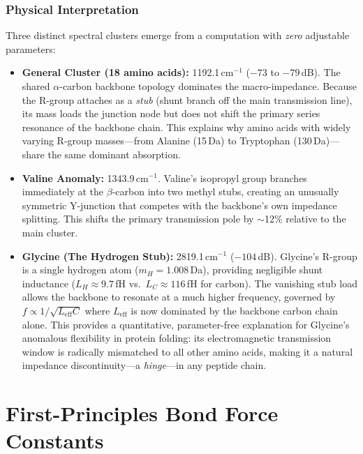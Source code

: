 \subsubsection{Physical Interpretation}

Three distinct spectral clusters emerge from a computation with \emph{zero} adjustable parameters:

\begin{itemize}
    \item \textbf{General Cluster (18 amino acids):} 1192.1\,cm$^{-1}$ ($-73$ to $-79$\,dB). The shared $\alpha$-carbon backbone topology dominates the macro-impedance. Because the R-group attaches as a \emph{stub} (shunt branch off the main transmission line), its mass loads the junction node but does not shift the primary series resonance of the backbone chain. This explains why amino acids with widely varying R-group masses---from Alanine (15\,Da) to Tryptophan (130\,Da)---share the same dominant absorption.

    \item \textbf{Valine Anomaly:} 1343.9\,cm$^{-1}$. Valine's isopropyl group branches immediately at the $\beta$-carbon into two methyl stubs, creating an unusually symmetric Y-junction that competes with the backbone's own impedance splitting. This shifts the primary transmission pole by $\sim$12\% relative to the main cluster.

    \item \textbf{Glycine (The Hydrogen Stub):} 2819.1\,cm$^{-1}$ ($-104$\,dB). Glycine's R-group is a single hydrogen atom ($m_H = 1.008$\,Da), providing negligible shunt inductance ($L_H \approx 9.7$\,fH vs.\ $L_C \approx 116$\,fH for carbon). The vanishing stub load allows the backbone to resonate at a much higher frequency, governed by $f \propto 1/\sqrt{L_\text{eff} C}$ where $L_\text{eff}$ is now dominated by the backbone carbon chain alone. This provides a quantitative, parameter-free explanation for Glycine's anomalous flexibility in protein folding: its electromagnetic transmission window is radically mismatched to all other amino acids, making it a natural impedance discontinuity---a \emph{hinge}---in any peptide chain.
\end{itemize}

\section{First-Principles Bond Force Constants}
\label{sec:first_principles_k}

